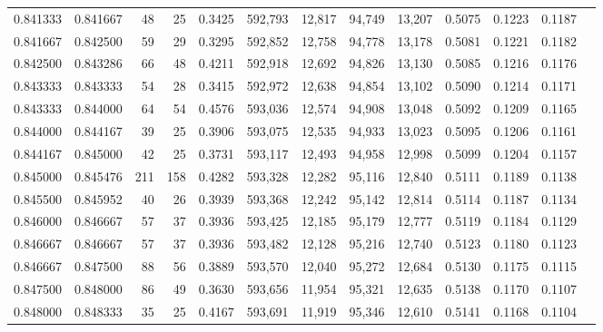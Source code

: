 \begin{tabular}{rrrrrrrrrrrrr}
0.841333 & 0.841667 &    48 &  25 &                                     0.3425 & 592,793 &  12,817 &  94,749 &  13,207 & 0.5075 & 0.1223 & 0.1187 \\
0.841667 & 0.842500 &    59 &  29 &                                     0.3295 & 592,852 &  12,758 &  94,778 &  13,178 & 0.5081 & 0.1221 & 0.1182 \\
0.842500 & 0.843286 &    66 &  48 &                                     0.4211 & 592,918 &  12,692 &  94,826 &  13,130 & 0.5085 & 0.1216 & 0.1176 \\
0.843333 & 0.843333 &    54 &  28 &                                     0.3415 & 592,972 &  12,638 &  94,854 &  13,102 & 0.5090 & 0.1214 & 0.1171 \\
0.843333 & 0.844000 &    64 &  54 &                                     0.4576 & 593,036 &  12,574 &  94,908 &  13,048 & 0.5092 & 0.1209 & 0.1165 \\
0.844000 & 0.844167 &    39 &  25 &                                     0.3906 & 593,075 &  12,535 &  94,933 &  13,023 & 0.5095 & 0.1206 & 0.1161 \\
0.844167 & 0.845000 &    42 &  25 &                                     0.3731 & 593,117 &  12,493 &  94,958 &  12,998 & 0.5099 & 0.1204 & 0.1157 \\
0.845000 & 0.845476 &   211 & 158 &                                     0.4282 & 593,328 &  12,282 &  95,116 &  12,840 & 0.5111 & 0.1189 & 0.1138 \\
0.845500 & 0.845952 &    40 &  26 &                                     0.3939 & 593,368 &  12,242 &  95,142 &  12,814 & 0.5114 & 0.1187 & 0.1134 \\
0.846000 & 0.846667 &    57 &  37 &                                     0.3936 & 593,425 &  12,185 &  95,179 &  12,777 & 0.5119 & 0.1184 & 0.1129 \\
0.846667 & 0.846667 &    57 &  37 &                                     0.3936 & 593,482 &  12,128 &  95,216 &  12,740 & 0.5123 & 0.1180 & 0.1123 \\
0.846667 & 0.847500 &    88 &  56 &                                     0.3889 & 593,570 &  12,040 &  95,272 &  12,684 & 0.5130 & 0.1175 & 0.1115 \\
0.847500 & 0.848000 &    86 &  49 &                                     0.3630 & 593,656 &  11,954 &  95,321 &  12,635 & 0.5138 & 0.1170 & 0.1107 \\
0.848000 & 0.848333 &    35 &  25 &                                     0.4167 & 593,691 &  11,919 &  95,346 &  12,610 & 0.5141 & 0.1168 & 0.1104 \\

\end{tabular}
